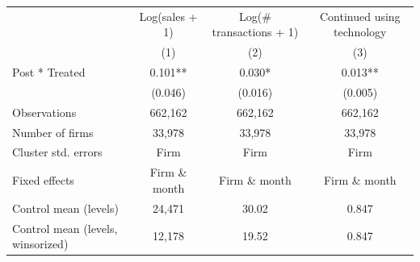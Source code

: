 \begin{tabular}[t]{lccc}
\toprule
  & Log(sales + 1) & Log(\# transactions + 1) & Continued using technology\\
& (1) & (2) & (3)\\
\midrule
Post * Treated & 0.101** & 0.030* & 0.013**\\
 & (0.046) & (0.016) & (0.005)\\
\midrule
Observations & 662,162 & 662,162 & 662,162\\
Number of firms & 33,978 & 33,978 & 33,978\\
Cluster std. errors & Firm & Firm & Firm\\
Fixed effects & Firm \& month & Firm \& month & Firm \& month\\
Control mean (levels) & 24,471 & 30.02 & 0.847\\
Control mean (levels, winsorized) & 12,178 & 19.52 & 0.847\\
\bottomrule
\end{tabular}

